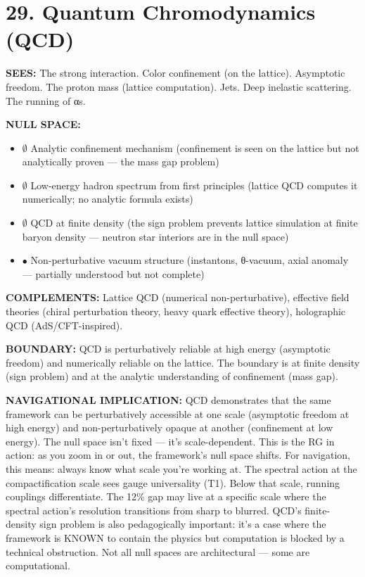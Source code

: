 \bigskip\noindent\makebox[\textwidth]{\color{rulegray}\rule{5cm}{0.3pt}}\bigskip


\section*{29. Quantum Chromodynamics (QCD)}


\textbf{SEES:} The strong interaction. Color confinement (on the lattice). Asymptotic freedom. The proton mass (lattice computation). Jets. Deep inelastic scattering. The running of αs.


\textbf{NULL SPACE:}

\begin{itemize}[nosep,leftmargin=*]
  \item $\emptyset$ Analytic confinement mechanism (confinement is seen on the lattice but not analytically proven — the mass gap problem)
  \item $\emptyset$ Low-energy hadron spectrum from first principles (lattice QCD computes it numerically; no analytic formula exists)
  \item $\emptyset$ QCD at finite density (the sign problem prevents lattice simulation at finite baryon density — neutron star interiors are in the null space)
  \item $\bullet$ Non-perturbative vacuum structure (instantons, θ-vacuum, axial anomaly — partially understood but not complete)
\end{itemize}


\textbf{COMPLEMENTS:} Lattice QCD (numerical non-perturbative), effective field theories (chiral perturbation theory, heavy quark effective theory), holographic QCD (AdS/CFT-inspired).


\textbf{BOUNDARY:} QCD is perturbatively reliable at high energy (asymptotic freedom) and numerically reliable on the lattice. The boundary is at finite density (sign problem) and at the analytic understanding of confinement (mass gap).


\textbf{NAVIGATIONAL IMPLICATION:} QCD demonstrates that the same framework can be perturbatively accessible at one scale (asymptotic freedom at high energy) and non-perturbatively opaque at another (confinement at low energy). The null space isn't fixed — it's scale-dependent. This is the RG in action: as you zoom in or out, the framework's null space shifts. For navigation, this means: always know what scale you're working at. The spectral action at the compactification scale sees gauge universality (T1). Below that scale, running couplings differentiate. The 12\% gap may live at a specific scale where the spectral action's resolution transitions from sharp to blurred. QCD's finite-density sign problem is also pedagogically important: it's a case where the framework is KNOWN to contain the physics but computation is blocked by a technical obstruction. Not all null spaces are architectural — some are computational.



